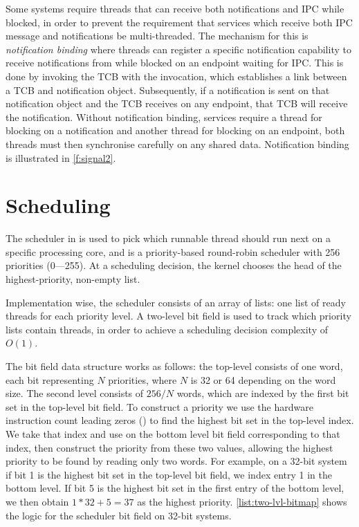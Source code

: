 Some systems require threads that can receive both notifications and IPC while blocked, in order to
prevent the requirement that services which receive both IPC message and notifications be
multi-threaded.  The mechanism for this is \emph{notification binding} where threads can register a
specific notification capability to receive notifications from while blocked on an endpoint waiting
for IPC. This is done by invoking the TCB with the  invocation, which
establishes a link between a TCB and notification object. Subsequently, if a notification is sent on
that notification object and the TCB receives on any endpoint, that TCB will receive the
notification.  Without notification binding, services require a thread for blocking on a
notification and another thread for blocking on an endpoint, both threads must then synchronise
carefully on any shared data.
Notification binding is illustrated in
\cref{f:signal2}.


\section{Scheduling}

The scheduler in \selfour is used to pick which runnable thread should run next on a specific
processing core, and is a priority-based round-robin scheduler with 256 priorities (0---255). 
At a scheduling decision, the kernel chooses the head of the highest-priority, non-empty list.

Implementation wise, the scheduler consists of an array of lists: one list of ready threads for each
priority level. A two-level bit field is used to track which priority lists contain threads, 
in order to achieve a scheduling decision complexity of $O(1)$. 

The bit field data structure works as follows: the
top-level consists of one word, each bit representing $N$ priorities, where $N$ is 32 or 64
depending on the word size. The second level consists of $256/N$ words, which are indexed by the first bit set in the
top-level bit field. To construct a priority we use the hardware instruction count leading zeros
() to find the highest bit set in the top-level index. We take that index and use
 on the bottom level bit field corresponding to that index, then construct the priority
from these two values, allowing the highest priority to be found by reading only two words. For
example, on a 32-bit system 
if bit 1 is the highest bit set in the top-level bit field, we index entry 1 in the
bottom level. If bit 5 is the highest bit set in the first entry of the bottom level, we then obtain
$1 * 32 + 5 = 37$ as the highest priority. 
\cref{list:two-lvl-bitmap} shows the logic for the scheduler bit field on 32-bit systems.

